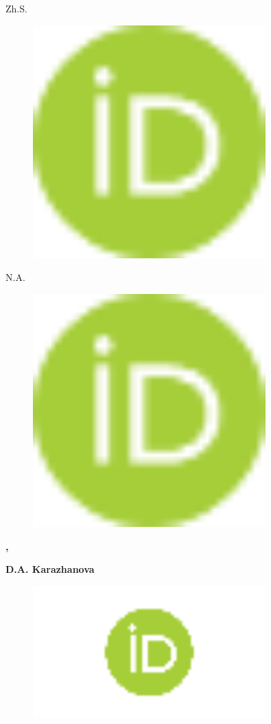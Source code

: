 {Zh.S.
\begin{figure}[H]
	\centering
	\includegraphics[width=0.8\textwidth]{media/chem2/image9}
	\caption*{}
\end{figure}

N.A.
\begin{figure}[H]
	\centering
	\includegraphics[width=0.8\textwidth]{media/chem2/image9}
	\caption*{}
\end{figure}

{\bfseries ,}

{\bfseries D.A. Karazhanova}
\begin{figure}[H]
	\centering
	\includegraphics[width=0.8\textwidth]{media/chem2/image10}
	\caption*{}
\end{figure}

}
